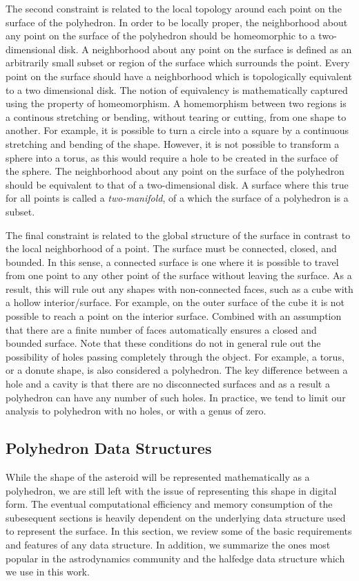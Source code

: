 The second constraint is related to the local topology around each point on the surface of the polyhedron.
In order to be locally proper, the neighborhood about any point on the surface of the polyhedron should be homeomorphic to a two-dimensional disk.
A neighborhood about any point on the surface is defined as an arbitrarily small subset or region of the surface which surrounds the point.
Every point on the surface should have a neighborhood which is topologically equivalent to a two dimensional disk.
The notion of equivalency is mathematically captured using the property of homeomorphism.
A homemorphism between two regions is a continous stretching or bending, without tearing or cutting, from one shape to another.
For example, it is possible to turn a circle into a square by a continuous stretching and bending of the shape.
However, it is not possible to transform a sphere into a torus, as this would require a hole to be created in the surface of the sphere.
The neighborhood about any point on the surface of the polyhedron should be equivalent to that of a two-dimensional disk.
A surface where this true for all points is called a \textit{two-manifold}, of a which the surface of a polyhedron is a subset.

The final constraint is related to the global structure of the surface in contrast to the local neighborhood of a point.
The surface must be connected, closed, and bounded.
In this sense, a connected surface is one where it is possible to travel from one point to any other point of the surface without leaving the surface. 
As a result, this will rule out any shapes with non-connected faces, such as a cube with a hollow interior/surface.
For example, on the outer surface of the cube it is not possible to reach a point on the interior surface. 
Combined with an assumption that there are a finite number of faces automatically ensures a closed and bounded surface. 
Note that these conditions do not in general rule out the possibility of holes passing completely through the object.
For example, a torus, or a donute shape, is also considered a polyhedron.
The key difference between a hole and a cavity is that there are no disconnected surfaces and as a result a polyhedron can have any number of such holes. 
In practice, we tend to limit our analysis to polyhedron with no holes, or with a genus of zero.


\subsection{Polyhedron Data Structures}\label{sec:polyhedron_data_structures}
While the shape of the asteroid will be represented mathematically as a polyhedron, we are still left with the issue of representing this shape in digital form. 
The eventual computational efficiency and memory consumption of the subesequent sections is heavily dependent on the underlying data structure used to represent the surface.
In this section, we review some of the basic requirements and features of any data structure.
In addition, we summarize the ones most popular in the astrodynamics community and the halfedge data structure which we use in this work.

